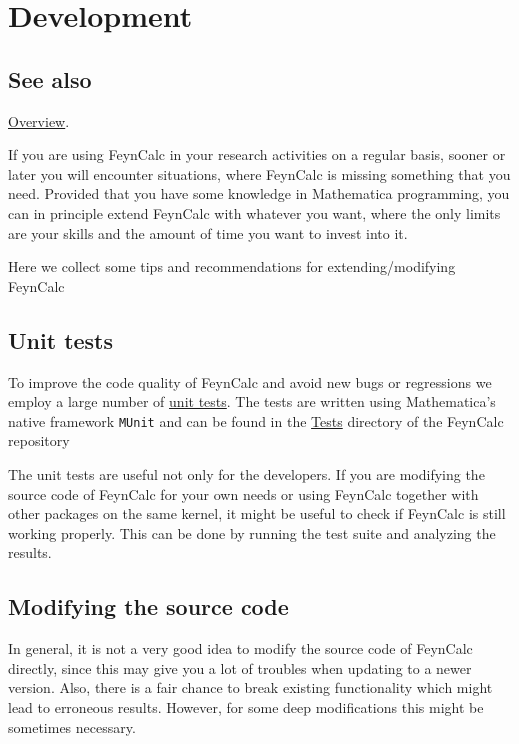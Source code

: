 \documentclass[../FeynCalcManual.tex]{subfiles}
\begin{document}
\hypertarget{development}{
\section{Development}\label{development}}

\subsection{See also}

\hyperlink{toc}{Overview}.

If you are using FeynCalc in your research activities on a regular
basis, sooner or later you will encounter situations, where FeynCalc is
missing something that you need. Provided that you have some knowledge
in Mathematica programming, you can in principle extend FeynCalc with
whatever you want, where the only limits are your skills and the amount
of time you want to invest into it.

Here we collect some tips and recommendations for extending/modifying
FeynCalc

\hypertarget{unit-tests}{%
\subsection{Unit tests}\label{unit-tests}}

To improve the code quality of FeynCalc and avoid new bugs or
regressions we employ a large number of
\href{https://en.wikipedia.org/wiki/Unit_testing}{unit tests}. The tests
are written using Mathematica's native framework \texttt{MUnit} and can
be found in the
\href{https://github.com/FeynCalc/feyncalc/tree/master/Tests}{Tests}
directory of the FeynCalc repository

The unit tests are useful not only for the developers. If you are
modifying the source code of FeynCalc for your own needs or using
FeynCalc together with other packages on the same kernel, it might be
useful to check if FeynCalc is still working properly. This can be done
by running the test suite and analyzing the results.

\hypertarget{modifying-the-source-code}{%
\subsection{Modifying the source code}\label{modifying-the-source-code}}

In general, it is not a very good idea to modify the source code of
FeynCalc directly, since this may give you a lot of troubles when
updating to a newer version. Also, there is a fair chance to break
existing functionality which might lead to erroneous results. However,
for some deep modifications this might be sometimes necessary.
\end{document}

